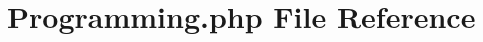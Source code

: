 \hypertarget{_programming_8php}{}\section{Programming.\+php File Reference}
\label{_programming_8php}
